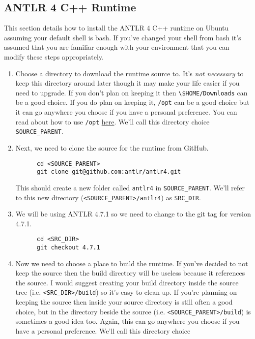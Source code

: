 \documentclass[../setup.tex]{subfiles}
\begin{document}
\subsection{ANTLR 4 C++ Runtime}
This section details how to install the ANTLR 4 C++ runtime on Ubuntu assuming your default shell
is bash. If you've changed your shell from bash it's assumed that you are familiar enough with your
environment that you can modify these steps appropriately.
\begin{enumerate}
  \item
    Choose a directory to download the runtime source to. It's \emph{not necessary} to keep this
    directory around later though it may make your life easier if you need to upgrade. If you don't
    plan on keeping it then \lstinline{\$HOME/Downloads} can be a good choice. If you do plan on
    keeping it, \lstinline{/opt} can be a good choice but it can go anywhere you choose if you have
    a personal preference. You can read about how to use \lstinline{/opt}
    \href{https://askubuntu.com/a/34922/550300} {here}. We'll call this directory choice
    \lstinline{SOURCE_PARENT}.
  \item
    Next, we need to clone the source for the runtime from GitHub.
    \begin{lstlisting}
      cd <SOURCE_PARENT>
      git clone git@github.com:antlr/antlr4.git
    \end{lstlisting}
    This should create a new folder called \lstinline{antlr4} in \lstinline{SOURCE_PARENT}. We'll
    refer to this new directory (\lstinline{<SOURCE_PARENT>/antlr4}) as \lstinline{SRC_DIR}.
  \item
    We will be using ANTLR 4.7.1 so we need to change to the git tag for version 4.7.1.
    \begin{lstlisting}
      cd <SRC_DIR>
      git checkout 4.7.1
    \end{lstlisting}
  \item
    Now we need to choose a place to build the runtime. If you've decided to not keep the source
    then the build directory will be useless because it references the source. I would suggest
    creating your build directory inside the source tree (i.e. \lstinline{<SRC_DIR>/build}) so
    it's easy to clean up. If you're planning on keeping the source then inside your source
    directory is still often a good choice, but in the directory beside the source (i.e.
    \lstinline{<SOURCE_PARENT>/build}) is sometimes a good idea too. Again, this can go anywhere
    you choose if you have a personal preference. We'll call this directory choice

\end{enumerate}
\end{document}
